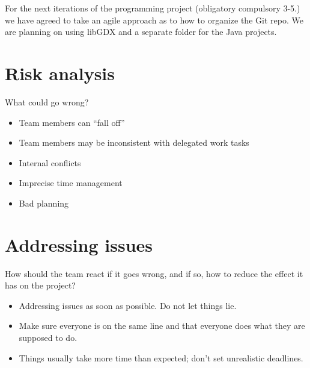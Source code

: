 \documentclass{article}
\begin{document}
For the next iterations of the programming project (obligatory compulsory 3-5.) we have agreed to take an agile approach as to how to organize the Git repo. We are planning on using libGDX and a separate folder for the Java projects.

\section*{Risk analysis}
What could go wrong?
\begin{itemize}
    \item Team members can “fall off”
    \item Team members may be inconsistent with delegated work tasks
    \item Internal conflicts
    \item Imprecise time management
    \item Bad planning
\end{itemize}

\section*{Addressing issues}
How should the team react if it goes wrong, and if so, how to reduce the effect it has on the project?
\begin{itemize}
    \item Addressing issues as soon as possible. Do not let things lie.
    \item Make sure everyone is on the same line and that everyone does what they are supposed to do.
    \item Things usually take more time than expected; don’t set unrealistic deadlines.
\end{itemize}
\end{document}

